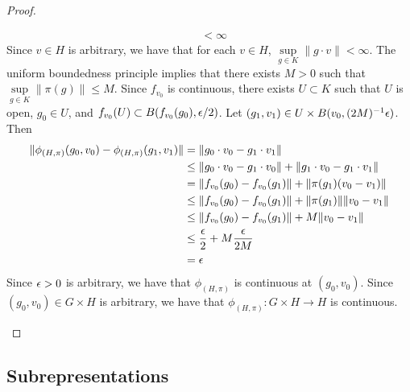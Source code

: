 \documentclass{book}
\begin{document}
\begin{proof}
\begin{enumerate}
\begin{align*}
				& < \infty
			\end{align*}  
			Since $v \in H$ is arbitrary, we have that for each $v \in H$, $\sup\limits_{g \in K} \|g \cdot v\| < \infty$. The uniform boundedness principle implies that  there exists $M > 0$ such that $\sup\limits_{g \in K} \| \pi(g) \| \leq M$. Since $f_{v_0}$ is continuous, there exists $U \subset K$ such that $U$ is open, $g_0 \in U$, and $f_{v_0}(U) \subset B(f_{v_0}(g_0), \epsilon/2)$. Let $(g_1, v_1) \in U \times B(v_0, (2M)^{-1} \epsilon)$. Then 
			\begin{align*}
				\|\phi_{(H, \pi)}(g_0, v_0) - \phi_{(H, \pi)}(g_1, v_1)\|
				& = \|g_0 \cdot v_0 - g_1 \cdot v_1\| \\
				& \leq 	\|g_0 \cdot v_0 - g_1 \cdot v_0\| + \|g_1 \cdot v_0 - g_1 \cdot v_1\| \\
				& = \|f_{v_0}(g_0) - f_{v_0}(g_1)\| + \|\pi(g_1)(v_0 - v_1)\| \\
				& \leq \|f_{v_0}(g_0) - f_{v_0}(g_1)\| + \|\pi(g_1)\| \|v_0 - v_1\| \\
				& \leq \|f_{v_0}(g_0) - f_{v_0}(g_1)\| + M \|v_0 - v_1\| \\
				& \leq \frac{\epsilon}{2} + M \frac{\epsilon}{2M} \\
				& = \epsilon
			\end{align*}
			Since $\epsilon > 0$ is arbitrary, we have that $\phi_{(H, \pi)}$ is continuous at $(g_0, v_0)$. Since $(g_0, v_0) \in G \times H$ is arbitrary, we have that $\phi_{(H, \pi)}: G \times H \rightarrow H$ is continuous.
		\end{enumerate}
	\end{proof}


	
	

































	
	
	
	
	
	
	\subsection{Subrepresentations}
	
\end{document}
